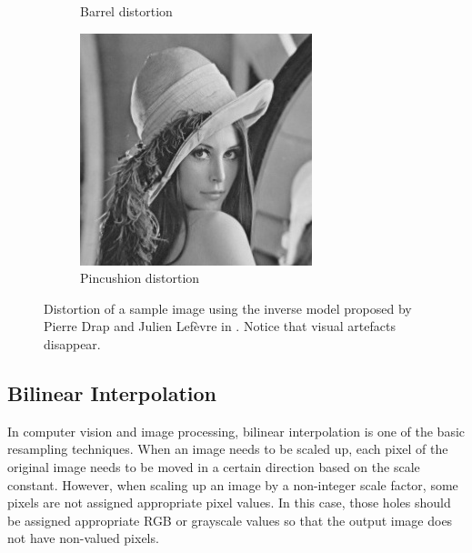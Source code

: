\documentclass[12pt]{article}
\begin{document}
\begin{figure}[h!]
\begin{subfigure}{0.30\linewidth}
		\caption{Barrel distortion}
		\label{lena12}
	\end{subfigure}\hfill
	\begin{subfigure}{0.30\linewidth}
		\centering
		\includegraphics[width=\linewidth]{./figures/lena21.jpg}
		\caption{Pincushion distortion}
		\label{lena22}
	\end{subfigure}
	\caption{Distortion of a sample image using the inverse model proposed by Pierre Drap and Julien Lefèvre in \cite{model}. Notice that visual artefacts disappear.}
	\label{exlena_approx}
\end{figure}

\subsection{Bilinear Interpolation}

In computer vision and image processing, bilinear interpolation is one of the basic resampling techniques. When an image needs to be scaled up, each pixel of the original image needs to be moved in a certain direction based on the scale constant. However, when scaling up an image by a non-integer scale factor, some pixels are not assigned appropriate pixel values. In this case, those holes should be assigned appropriate RGB or grayscale values so that the output image does not have non-valued pixels.
\end{document}
